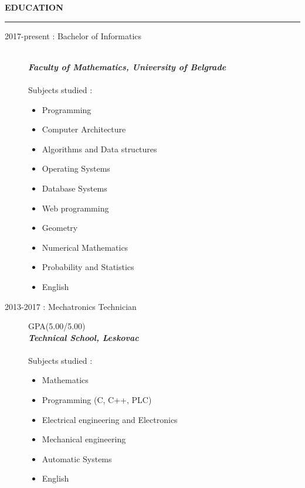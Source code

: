 \documentclass{article}
\begin{document}
\textbf{\large EDUCATION}\\
\color{my_col}\noindent\rule{15.4cm}{0.6pt}\color{black}
\begin{description}
    \item[ 2017-present : Bachelor of Informatics ]\hfill \\
    \textbf{\textit{Faculty of Mathematics, University of Belgrade}}\\
    \normalsize \\
    Subjects studied :
     \begin{multicols}{2}
    \begin{itemize}
    \item Programming
    \item Computer Architecture
    \item Algorithms and Data structures
    \item Operating Systems
    \item Database Systems
    \item Web programming
    \item Geometry
    \item Numerical Mathematics
    \item Probability and Statistics 
    \item English
    \end{itemize}
    \end{multicols}
\end{description}

\begin{description}
    \item[ 2013-2017 : Mechatronics Technician] GPA(5.00/5.00)\hfill \\
    \textbf{\textit{Technical School, Leskovac}}\\
    \normalsize \\
    Subjects studied :
     \begin{multicols}{2}
    \begin{itemize}
    \item Mathematics
    \item Programming (C, C++, PLC)
    \item Electrical engineering and Electronics
    \item Mechanical engineering
    \item Automatic Systems
    \item English
    \end{itemize}
    \end{multicols}
\end{description}
\end{document}
